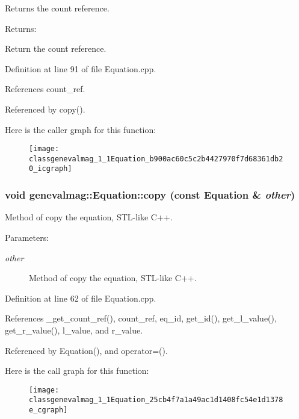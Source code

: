 Returns the count reference. \begin{Desc}
\item[Returns:]\end{Desc}
Return the count reference. 

Definition at line 91 of file Equation.cpp.

References count\_\-ref.

Referenced by copy().

Here is the caller graph for this function:\nopagebreak
\begin{figure}[H]
\begin{center}
\leavevmode
\texttt{[image: classgenevalmag\_1\_1Equation\_b900ac60c5c2b4427970f7d68361db20\_icgraph]}
\end{center}
\end{figure}
\hypertarget{classgenevalmag_1_1Equation_25cb4f7a1a49ac1d1408fc54e1d1378e}{
\subsubsection[{copy}]{\setlength{\rightskip}{0pt plus 5cm}void genevalmag::Equation::copy (const {\bf Equation} \& {\em other})}}
\label{classgenevalmag_1_1Equation_25cb4f7a1a49ac1d1408fc54e1d1378e}


Method of copy the equation, STL-like C++. \begin{Desc}
\item[Parameters:]
\begin{description}
\item[{\em other}]Method of copy the equation, STL-like C++. \end{description}
\end{Desc}


Definition at line 62 of file Equation.cpp.

References \_\-get\_\-count\_\-ref(), count\_\-ref, eq\_\-id, get\_\-id(), get\_\-l\_\-value(), get\_\-r\_\-value(), l\_\-value, and r\_\-value.

Referenced by Equation(), and operator=().

Here is the call graph for this function:\nopagebreak
\begin{figure}[H]
\begin{center}
\leavevmode
\texttt{[image: classgenevalmag\_1\_1Equation\_25cb4f7a1a49ac1d1408fc54e1d1378e\_cgraph]}
\end{center}
\end{figure}


